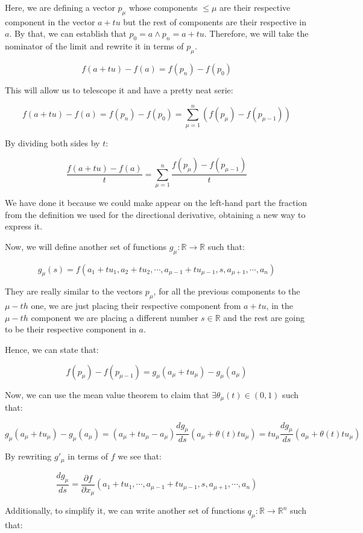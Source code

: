 \documentclass[12pt]{article}
\begin{document}
	Here, we are defining a vector $p_\mu$ whose components $\le \mu$ are their respective component in the vector $a + tu$ but the rest of components are their respective in $a$. By that, we can establish that $p_0 = a \wedge p_n = a + tu$. Therefore, we will take the nominator of the limit and rewrite it in terms of $p_\mu$.
	
	\[
		f(a + tu) - f(a) = f(p_n) - f(p_0)
	\]
	
	This will allow us to telescope it and have a pretty neat serie:
	
	\[
		f(a + tu) - f(a) = f(p_n) - f(p_0) = \sum_{\mu = 1}^n (f(p_\mu) - f(p_{\mu - 1}))
	\]
	
	By dividing both sides by $t$:
	
	\[
		\frac{f(a + tu) - f(a)}{t} = \sum_{\mu = 1}^n \frac{f(p_\mu) - f(p_{\mu - 1})}{t}
	\]
	
	We have done it because we could make appear on the left-hand part the fraction from the definition we used for the directional derivative, obtaining a new way to express it.
	
	Now, we will define another set of functions $g_\mu : \mathbb{R} \to \mathbb{R}$ such that:
	
	\[
		g_\mu(s) = f(a_1 + tu_1, a_2 + tu_2, \cdots, a_{\mu - 1} + tu_{\mu - 1}, s, a_{\mu + 1}, \cdots, a_n)
	\]
	
	They are really similar to the vectors $p_\mu$, for all the previous components to the $\mu-th$ one, we are just placing their respective component from $a + tu$, in the $\mu-th$ component we are placing a different number $s \in \mathbb{R}$ and the rest are going to be their respective component in $a$.
	
	Hence, we can state that:
	
	\[
		f(p_\mu) - f(p_{\mu - 1}) = g_\mu(a_\mu + t u_\mu) - g_{\mu}(a_\mu)
	\]
	
	Now, we can use the mean value theorem to claim that $\exists \theta_\mu(t) \in (0, 1)$ such that:
	
	\[
		g_\mu(a_\mu + t u_\mu) - g_{\mu}(a_\mu)
		= (a_\mu + t u_\mu - a_\mu) \frac{dg_\mu}{ds}(a_\mu + \theta(t)tu_\mu)
		= t u_\mu \frac{dg_\mu}{ds}(a_\mu + \theta(t)tu_\mu)
	\]
	
	By rewriting $g'_\mu$ in terms of $f$ we see that:
	
	\[
		\frac{dg_\mu}{ds}
		= \frac{\partial f}{\partial x_\mu}(a_1 + tu_1, \cdots, a_{\mu - 1} + tu_{\mu - 1}, s, a_{\mu + 1}, \cdots, a_n)
	\]
	
	Additionally, to simplify it, we can write another set of functions $q_\mu : \mathbb{R} \to \mathbb{R}^n$ such that:
	
\end{document}
